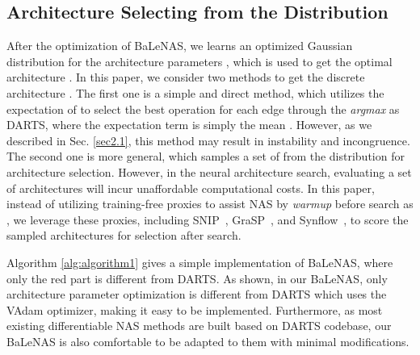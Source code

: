 \documentclass[10pt,twocolumn,letterpaper]{article}
\begin{document}
\subsection{Architecture Selecting from the Distribution}
After the optimization of BaLeNAS, we learns an optimized Gaussian distribution for the architecture parameters , which is used to get the optimal architecture . In this paper, we consider two methods to get the discrete architecture . The first one is a simple and direct method, which utilizes the expectation of  to select the best operation for each edge through the \textit{argmax} as DARTS, where the expectation term is simply the mean  \cite{chen2020drnas}. However, as we described in Sec. \ref{sec2.1}, this method may result in instability and incongruence. The second one is more general, which samples a set of  from the distribution  for architecture selection. However, in the neural architecture search, evaluating a set of architectures will incur unaffordable computational costs. In this paper, instead of utilizing training-free proxies to assist NAS by \textit{warmup} before search as \cite{abdelfattah2021zero}, we leverage these proxies, including SNIP~\cite{lee2018snip}, GraSP~\cite{wang2019picking}, and Synflow~\cite{tanaka2020pruning}, to score the sampled architectures for selection after search.


Algorithm \ref{alg:algorithm1} gives a simple implementation of BaLeNAS, where only the red part is different from DARTS. As shown, in our BaLeNAS, only architecture parameter optimization is different from DARTS which uses the VAdam optimizer, making it easy to be implemented. Furthermore, as most existing differentiable NAS methods are built based on DARTS codebase, our BaLeNAS is also comfortable to be adapted to them with minimal modifications. 
\end{document}
